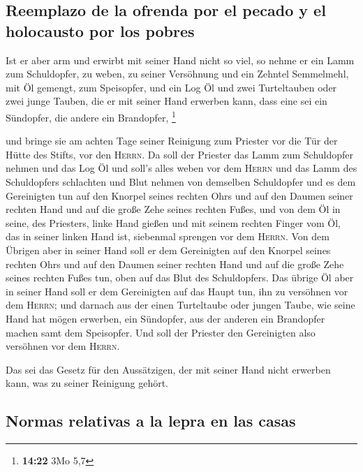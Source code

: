 \hypertarget{reemplazo-de-la-ofrenda-por-el-pecado-y-el-holocausto-por-los-pobres}{%
\subsection{Reemplazo de la ofrenda por el pecado y el holocausto por
los
pobres}\label{reemplazo-de-la-ofrenda-por-el-pecado-y-el-holocausto-por-los-pobres}}

 Ist er aber arm und erwirbt mit seiner Hand nicht so
viel, so nehme er ein Lamm zum Schuldopfer, zu weben, zu seiner
Versöhnung und ein Zehntel Semmelmehl, mit Öl gemengt, zum Speisopfer,
und ein Log Öl  und zwei Turteltauben oder zwei junge
Tauben, die er mit seiner Hand erwerben kann, dass eine sei ein
Sündopfer, die andere ein Brandopfer, \footnote{\textbf{14:22} 3Mo 5,7}

 und bringe sie am achten Tage seiner Reinigung zum
Priester vor die Tür der Hütte des Stifts, vor den \textsc{Herrn}.
 Da soll der Priester das Lamm zum Schuldopfer nehmen und
das Log Öl und soll's alles weben vor dem \textsc{Herrn} 
und das Lamm des Schuldopfers schlachten und Blut nehmen von demselben
Schuldopfer und es dem Gereinigten tun auf den Knorpel seines rechten
Ohrs und auf den Daumen seiner rechten Hand und auf die große Zehe
seines rechten Fußes,  und von dem Öl in seine, des
Priesters, linke Hand gießen  und mit seinem rechten
Finger vom Öl, das in seiner linken Hand ist, siebenmal sprengen vor dem
\textsc{Herrn}.  Von dem Übrigen aber in seiner Hand soll
er dem Gereinigten auf den Knorpel seines rechten Ohrs und auf den
Daumen seiner rechten Hand und auf die große Zehe seines rechten Fußes
tun, oben auf das Blut des Schuldopfers.  Das übrige Öl
aber in seiner Hand soll er dem Gereinigten auf das Haupt tun, ihn zu
versöhnen vor dem \textsc{Herrn};  und darnach aus der
einen Turteltaube oder jungen Taube, wie seine Hand hat mögen erwerben,
 ein Sündopfer, aus der anderen ein Brandopfer machen
samt dem Speisopfer. Und soll der Priester den Gereinigten also
versöhnen vor dem \textsc{Herrn}.

 Das sei das Gesetz für den Aussätzigen, der mit seiner
Hand nicht erwerben kann, was zu seiner Reinigung gehört.

\hypertarget{normas-relativas-a-la-lepra-en-las-casas}{%
\subsection{Normas relativas a la lepra en las
casas}\label{normas-relativas-a-la-lepra-en-las-casas}}

